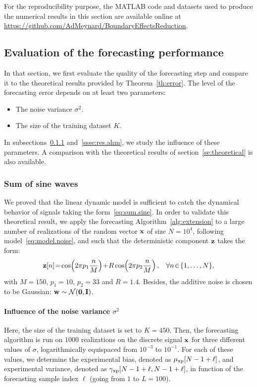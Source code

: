 For the reproducibility purpose, the MATLAB code and datasets used to produce the numerical results in this section are available online at \url{https://github.com/AdMeynard/BoundaryEffectsReduction}.

\subsection{Evaluation of the forecasting performance}
In that section, we first evaluate the quality of the forecasting step and compare it to the theoretical results provided by Theorem~\ref{th:error}. The level of the forecasting error depends on at least two parameters:
\begin{itemize}
\item The noise variance $\sigma^2$.
\item The size of the training dataset $K$. 
\end{itemize}
In subsections~\ref{ssse:res.sine} and~\ref{ssse:res.ahm}, we study the influence of these parameters. A comparison with the theoretical results of section~\ref{se:theoretical} is also available.

\subsubsection{Sum of sine waves}
\label{ssse:res.sine}
We proved that the linear dynamic model is sufficient to catch the dynamical behavior of signals taking the form~\eqref{eq:sum.sine}. In order to validate this theoretical result, we apply the forecasting Algorithm~\ref{alg:extension} to a large number of realizations of the random vector ${\mathbf x}$ of size $N=10^4$, following model~\eqref{eq:model.noise}, and such that the deterministic component ${\mathbf z}$ takes the form:
\[
\bz[n]\! =\!\cos\!\left(2\pi p_1 \dfrac{n}{M} \right)\! +\! R\cos\!\left(2\pi p_2 \dfrac{n}{M} \right),\quad \!\forall n\!\in\!\{1,\ldots,N\},
\]
with $M=150$, $p_1=10$, $p_2=33$ and $R=1.4$. Besides, the additive noise is chosen to be Gaussian: ${\mathbf w}\sim{\mathcal N}(\boldsymbol{0},{\mathbf I})$.

\paragraph{Influence of the noise variance $\sigma^2$} Here, the size of the training dataset is set to $K=450$. Then, the forecasting algorithm is run on $1000$ realizations on the discrete signal ${\mathbf x}$ for three different values of $\sigma$, logarithmically equispaced from $10^{-3}$ to $10^{-1}$. For each of these values, we determine the experimental bias, denoted as $\mu_{{\mathrm{xp}}}[N-1+\ell]$, and experimental variance, denoted as $\gamma_{{\mathrm{xp}}}[N-1+\ell,N-1+\ell]$, in function of the forecasting sample index $\ell$ (going from $1$ to $L=100$).

